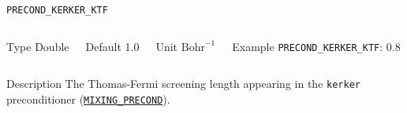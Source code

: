 \begin{frame}[allowframebreaks]{\texttt{PRECOND\_KERKER\_KTF}} \label{PRECOND_KERKER_KTF}
\vspace*{-12pt}
\begin{columns}
\begin{block}{Type}
Double
\end{block}

\begin{block}{Default}
1.0
\end{block}

\begin{block}{Unit}
$\textrm{Bohr}^{-1}$
\end{block}

\begin{block}{Example}
\texttt{PRECOND\_KERKER\_KTF}: 0.8
\end{block}
\end{columns}

\begin{block}{Description}
The Thomas-Fermi screening length appearing in the \texttt{kerker} preconditioner (\hyperlink{MIXING_PRECOND}{\texttt{MIXING\_PRECOND}}). 
\end{block}

\end{frame}



